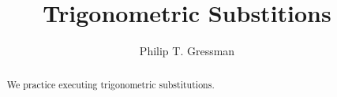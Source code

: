 \documentclass{ximera}
\title{Trigonometric Substitions}
\author{Philip T. Gressman}
\begin{document}
\begin{abstract}
  We practice executing trigonometric substitutions.
\end{abstract}
\maketitle


\begin{example}

\end{example}

\begin{example}

\end{example}
\end{document}
